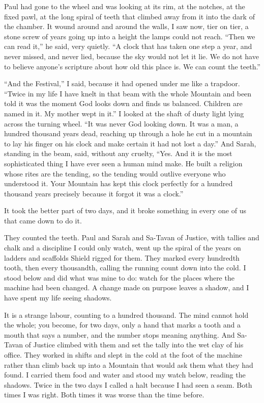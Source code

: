 Paul had gone to the wheel and was looking at its rim, at the notches, at the fixed pawl, at the long spiral of teeth that climbed away from it into the dark of the chamber. It wound around and around the walls, I saw now, tier on tier, a stone screw of years going up into a height the lamps could not reach. ``Then we can read it,'' he said, very quietly. ``A clock that has taken one step a year, and never missed, and never lied, because the sky would not let it lie. We do not have to believe anyone's scripture about how old this place is. We can count the teeth.''\par

``And the Festival,'' I said, because it had opened under me like a trapdoor. ``Twice in my life I have knelt in that beam with the whole Mountain and been told it was the moment God looks down and finds us balanced. Children are named in it. My mother wept in it.'' I looked at the shaft of dusty light lying across the turning wheel. ``It was never God looking down. It was a man, a hundred thousand years dead, reaching up through a hole he cut in a mountain to lay his finger on his clock and make certain it had not lost a day.'' And Sarah, standing in the beam, said, without any cruelty, ``Yes. And it is the most sophisticated thing I have ever seen a human mind make. He built a religion whose rites are the tending, so the tending would outlive everyone who understood it. Your Mountain has kept this clock perfectly for a hundred thousand years precisely because it forgot it was a clock.''\par

\ornament

It took the better part of two days, and it broke something in every one of us that came down to do it.\par

They counted the teeth. Paul and Sarah and Sa-Tavan of Justice, with tallies and chalk and a discipline I could only watch, went up the spiral of the years on ladders and scaffolds Shield rigged for them. They marked every hundredth tooth, then every thousandth, calling the running count down into the cold. I stood below and did what was mine to do: watch for the places where the machine had been changed. A change made on purpose leaves a shadow, and I have spent my life seeing shadows.\par

It is a strange labour, counting to a hundred thousand. The mind cannot hold the whole; you become, for two days, only a hand that marks a tooth and a mouth that says a number, and the number stops meaning anything. And Sa-Tavan of Justice climbed with them and set the tally into the wet clay of his office. They worked in shifts and slept in the cold at the foot of the machine rather than climb back up into a Mountain that would ask them what they had found. I carried them food and water and stood my watch below, reading the shadows. Twice in the two days I called a halt because I had seen a seam. Both times I was right. Both times it was worse than the time before.\par

